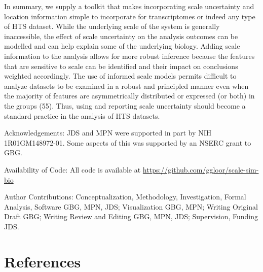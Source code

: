 \documentclass[
]{article}
\begin{document}
In summary, we supply a toolkit that makes incorporating scale
uncertainty and location information simple to incorporate for
transcriptomes or indeed any type of HTS dataset. While the underlying
scale of the system is generally inaccessible, the effect of scale
uncertainty on the analysis outcomes can be modelled and can help
explain some of the underlying biology. Adding scale information to the
analysis allows for more robust inference because the features that are
sensitive to scale can be identified and their impact on conclusions
weighted accordingly. The use of informed scale models permits difficult
to analyze datasets to be examined in a robust and principled manner
even when the majority of features are asymmetrically distributed or
expressed (or both) in the groups (55). Thus, using and reporting scale
uncertainty should become a standard practice in the analysis of HTS
datasets.

Acknowledgements: JDS and MPN were supported in part by NIH
1R01GM148972-01. Some aspects of this was supported by an NSERC grant to
GBG.

Availability of Code: All code is available at
\url{https://github.com/ggloor/scale-sim-bio}

Author Contributions: Conceptualization, Methodology, Investigation,
Formal Analysis, Software GBG, MPN, JDS; Visualization GBG, MPN; Writing
Original Draft GBG; Writing Review and Editing GBG, MPN, JDS;
Supervision, Funding JDS. \singlespacing

\section*{References}\label{references}
\end{document}
